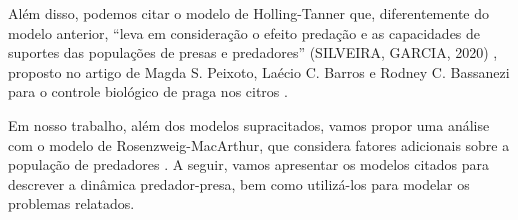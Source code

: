 Além disso, podemos citar o modelo de Holling-Tanner que, diferentemente do modelo anterior, ``leva em consideração o efeito predação e as capacidades de suportes das populações de presas e predadores'' (SILVEIRA, GARCIA, 2020) \cite{gs_rg_2020}, proposto no artigo de Magda S. Peixoto, Laécio C. Barros e Rodney C. Bassanezi para o controle biológico de praga nos citros \cite{mp_lb_rb_2005}. 

Em nosso trabalho, além dos modelos supracitados, vamos propor uma análise com o modelo de Rosenzweig-MacArthur, que considera fatores adicionais sobre a população de predadores \cite{id_mg_r_2021}. A seguir, vamos apresentar os modelos citados para descrever a dinâmica predador-presa, bem como utilizá-los para modelar os problemas relatados.